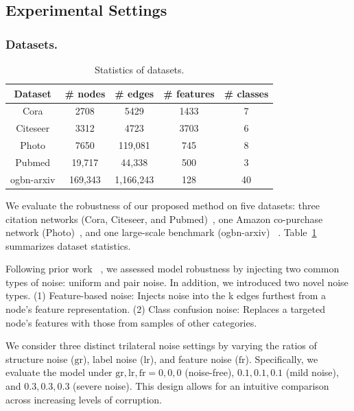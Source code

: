 \documentclass[sigconf, anonymous, review]{acmart}
\begin{document}
  \subsection{Experimental Settings}
    \subsubsection{Datasets.}
      \begin{table}
        \centering
        \caption{Statistics of datasets.}
        {\small
        \begin{tabular}{ccccc}
          \toprule
          Dataset & \# nodes & \# edges & \# features & \# classes \\
          \midrule
          Cora & 2708 & 5429 & 1433 & 7 \\
          Citeseer & 3312 & 4723 & 3703 & 6 \\
          Photo & 7650 & 119{,}081 & 745 & 8 \\
          Pubmed & 19{,}717 & 44{,}338 & 500 & 3 \\
          ogbn-arxiv & 169{,}343 & 1{,}166{,}243 & 128 & 40 \\
          \bottomrule
        \end{tabular}}
        \label{tab:dataset}
      \end{table}
      We evaluate the robustness of our proposed method on five datasets: three citation networks (Cora, Citeseer, and Pubmed)~\cite{sen2008collective}, one Amazon co-purchase network (Photo)~\cite{shchur2018pitfalls}, and one large-scale benchmark (ogbn-arxiv) ~\cite{hu2021ogb}. Table~\ref{tab:dataset} summarizes dataset statistics.

      Following prior work ~\cite{zhu2024robust, in2024noise, qian2023robust}, we assessed model robustness by injecting two common types of noise: uniform and pair noise. In addition, we introduced two novel noise types.
      (1) Feature-based noise: Injects noise into the k edges furthest from a node's feature representation.
      (2)  Class confusion noise: Replaces a targeted node's features with those from samples of other categories. 

      We consider three distinct trilateral noise settings by varying the ratios of structure noise ($\text{gr}$), label noise ($\text{lr}$), and feature noise ($\text{fr}$). Specifically, we evaluate the model under ${\text{gr}, \text{lr}, \text{fr}} = {0, 0, 0}$ (noise-free), ${0.1, 0.1, 0.1}$ (mild noise), and ${0.3, 0.3, 0.3}$ (severe noise). This design allows for an intuitive comparison across increasing levels of corruption.
\end{document}
